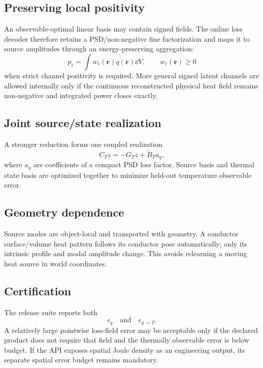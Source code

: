 \subsection{Preserving local positivity}

An observable-optimal linear basis may contain signed fields. The online loss
decoder therefore retains a PSD/non-negative fine factorization and maps it to
source amplitudes through an energy-preserving aggregation:
\[
  p_\ell
  =
  \int w_\ell(\mathbf r)q(\mathbf r)\dd V,
  \qquad
  w_\ell(\mathbf r)\ge0
\]
when strict channel positivity is required. More general signed latent channels
are allowed internally only if the continuous reconstructed physical heat field
remains non-negative and integrated power closes exactly.

\subsection{Joint source/state realization}

A stronger reduction forms one coupled realization
\[
  C_T\dot z=-G_Tz+\widetilde B_T a_q,
\]
where $a_q$ are coefficients of a compact PSD loss factor. Source basis and
thermal state basis are optimized together to minimize held-out temperature
observable error.

\subsection{Geometry dependence}

Source modes are object-local and transported with geometry. A conductor
surface/volume heat pattern follows its conductor pose automatically; only its
intrinsic profile and modal amplitude change. This avoids relearning a moving
heat source in world coordinates.

\subsection{Certification}

The release suite reports both
\[
  \epsilon_q
  \quad\text{and}\quad
  \epsilon_{q\to T}.
\]
A relatively large pointwise loss-field error may be acceptable only if the
declared product does not require that field and the thermally observable error
is below budget. If the API exposes spatial Joule density as an engineering
output, its separate spatial error budget remains mandatory.
